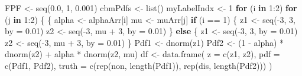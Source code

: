 \documentclass[
]{book}
\newenvironment{Shaded}{\begin{snugshade}}{\end{snugshade}}
\newcommand{\AttributeTok}[1]{\textcolor[rgb]{0.77,0.63,0.00}{#1}}
\newcommand{\ControlFlowTok}[1]{\textcolor[rgb]{0.13,0.29,0.53}{\textbf{#1}}}
\newcommand{\DecValTok}[1]{\textcolor[rgb]{0.00,0.00,0.81}{#1}}
\newcommand{\FloatTok}[1]{\textcolor[rgb]{0.00,0.00,0.81}{#1}}
\newcommand{\FunctionTok}[1]{\textcolor[rgb]{0.00,0.00,0.00}{#1}}
\newcommand{\NormalTok}[1]{#1}
\newcommand{\OtherTok}[1]{\textcolor[rgb]{0.56,0.35,0.01}{#1}}
\newcommand{\SpecialCharTok}[1]{\textcolor[rgb]{0.00,0.00,0.00}{#1}}
\newcommand{\StringTok}[1]{\textcolor[rgb]{0.31,0.60,0.02}{#1}}
\begin{document}
\begin{Shaded}
\begin{Highlighting}[]
\NormalTok{FPF }\OtherTok{\textless{}{-}} \FunctionTok{seq}\NormalTok{(}\FloatTok{0.0}\NormalTok{, }\DecValTok{1}\NormalTok{, }\FloatTok{0.001}\NormalTok{)}
\NormalTok{cbmPdfs }\OtherTok{\textless{}{-}} \FunctionTok{list}\NormalTok{()}
\NormalTok{myLabelIndx }\OtherTok{\textless{}{-}} \DecValTok{1}
\ControlFlowTok{for}\NormalTok{ (i }\ControlFlowTok{in} \DecValTok{1}\SpecialCharTok{:}\DecValTok{2}\NormalTok{)}
  \ControlFlowTok{for}\NormalTok{ (j }\ControlFlowTok{in} \DecValTok{1}\SpecialCharTok{:}\DecValTok{2}\NormalTok{) }
\NormalTok{  \{}
\NormalTok{    \{}
\NormalTok{      alpha }\OtherTok{\textless{}{-}}\NormalTok{ alphaArr[i]}
\NormalTok{      mu }\OtherTok{\textless{}{-}}\NormalTok{ muArr[j]}
      \ControlFlowTok{if}\NormalTok{ (i }\SpecialCharTok{==} \DecValTok{1}\NormalTok{) \{}
\NormalTok{        z1 }\OtherTok{\textless{}{-}} \FunctionTok{seq}\NormalTok{(}\SpecialCharTok{{-}}\DecValTok{3}\NormalTok{, }\DecValTok{3}\NormalTok{, }\AttributeTok{by =} \FloatTok{0.01}\NormalTok{)}
\NormalTok{        z2 }\OtherTok{\textless{}{-}} \FunctionTok{seq}\NormalTok{(}\SpecialCharTok{{-}}\DecValTok{3}\NormalTok{, mu }\SpecialCharTok{+} \DecValTok{3}\NormalTok{, }\AttributeTok{by =} \FloatTok{0.01}\NormalTok{)}
\NormalTok{      \} }\ControlFlowTok{else}\NormalTok{ \{}
\NormalTok{        z1 }\OtherTok{\textless{}{-}} \FunctionTok{seq}\NormalTok{(}\SpecialCharTok{{-}}\DecValTok{3}\NormalTok{, }\DecValTok{3}\NormalTok{, }\AttributeTok{by =} \FloatTok{0.01}\NormalTok{)}
\NormalTok{        z2 }\OtherTok{\textless{}{-}} \FunctionTok{seq}\NormalTok{(}\SpecialCharTok{{-}}\DecValTok{3}\NormalTok{, mu }\SpecialCharTok{+} \DecValTok{3}\NormalTok{, }\AttributeTok{by =} \FloatTok{0.01}\NormalTok{)}
\NormalTok{      \}}
\NormalTok{      Pdf1 }\OtherTok{\textless{}{-}} \FunctionTok{dnorm}\NormalTok{(z1)}
\NormalTok{      Pdf2 }\OtherTok{\textless{}{-}}\NormalTok{ (}\DecValTok{1} \SpecialCharTok{{-}}\NormalTok{ alpha) }\SpecialCharTok{*} \FunctionTok{dnorm}\NormalTok{(z2) }\SpecialCharTok{+}\NormalTok{ alpha }\SpecialCharTok{*} \FunctionTok{dnorm}\NormalTok{(z2, mu)}
\NormalTok{      df }\OtherTok{\textless{}{-}} \FunctionTok{data.frame}\NormalTok{(}
        \AttributeTok{z =} \FunctionTok{c}\NormalTok{(z1, z2), }\AttributeTok{pdf =} \FunctionTok{c}\NormalTok{(Pdf1, Pdf2), }
        \AttributeTok{truth =} \FunctionTok{c}\NormalTok{(}\FunctionTok{rep}\NormalTok{(}\StringTok{\textquotesingle{}non\textquotesingle{}}\NormalTok{, }\FunctionTok{length}\NormalTok{(Pdf1)), }
                  \FunctionTok{rep}\NormalTok{(}\StringTok{\textquotesingle{}dis\textquotesingle{}}\NormalTok{, }\FunctionTok{length}\NormalTok{(Pdf2)))}
\NormalTok{      )}
      

\end{Highlighting}
\end{Shaded}
\end{document}
